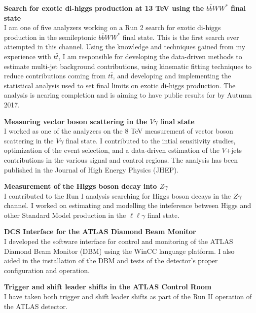 \documentclass[margin,line]{res}
\begin{document}
\begin{resume}
{\bf Search for exotic di-higgs production at 13 TeV using the $b\bar{b}WW^*$ final state}\\
I am one of five analyzers working on a Run 2 search for exotic di-higgs production in the semileptonic $b\bar{b}WW^*$ final state. This is the first search ever attempted in this channel. Using the knowledge and techniques gained from my experience with $t\bar{t}$, I am responsible for developing the data-driven methods to estimate multi-jet background contributions, using kinematic fitting techniques to reduce contributions coming from $t\bar{t}$, and developing and implementing the statistical analysis used to set final limits on exotic di-higgs production. The analysis is nearing completion and is aiming to have public results for by Autumn 2017.

\newpage

{\bf Measuring vector boson scattering in the $V\gamma$ final state}\\
I worked as one of the analyzers on the 8 TeV measurement of vector boson scattering in the $V\gamma$ final state. I contributed to the intial sensitivity studies, optimization of the event selection, and a data-driven estimation of the $V$+jets contributions in the various signal and control regions. The analysis has been published in the Journal of High Energy Physics (JHEP).


{\bf Measurement of the Higgs boson decay into $Z\gamma$}\\
I contributed to the Run I analysis searching for Higgs boson decays in the $Z\gamma$ channel. I worked on estimating and modelling the inteference between Higgs and other Standard Model production in the $\ell\ell\gamma$ final state.

{\bf DCS Interface for the ATLAS Diamond Beam Monitor }\\ 
I developed the software interface for control and monitoring of the ATLAS Diamond Beam Monitor (DBM) using the WinCC language platform. I also aided in the installation of the DBM and tests of the detector's proper configuration and operation.

{\bf Trigger and shift leader shifts in the ATLAS Control Room} \\ 
I have taken both trigger and shift leader shifts as part of the Run II operation of the ATLAS detector.
\vspace{5pt}



\end{resume}
\end{document}
